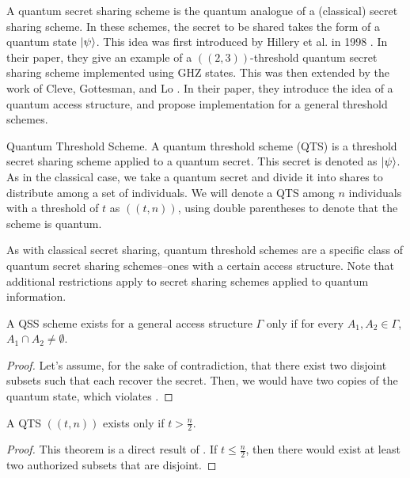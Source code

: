 A quantum secret sharing scheme is the quantum analogue of a (classical) secret sharing scheme. In these schemes, the secret to be shared takes the form of a quantum state $\ket{\psi}$. This idea was first introduced by Hillery et al. in 1998 \cite{Hillery_1999}. In their paper, they give an example of a $((2,3))$-threshold quantum secret sharing scheme implemented using GHZ states. This was then extended by the work of Cleve, Gottesman, and Lo \cite{Cleve_1999}. In their paper, they introduce the idea of a quantum access structure, and propose implementation for a general threshold schemes.

\begin{definition}{Quantum Threshold Scheme.}
    \label{defn:qts}
    A quantum threshold scheme (QTS) is a threshold secret sharing scheme applied to a quantum secret. This secret is denoted as $\ket{\psi}$. As in the classical case, we take a quantum secret and divide it into shares to distribute among a set of individuals. We will denote a QTS among $n$ individuals with a threshold of $t$ as $((t,n))$, using double parentheses to denote that the scheme is quantum.
\end{definition}

As with classical secret sharing, quantum threshold schemes are a specific class of quantum secret sharing schemes--ones with a certain access structure. Note that additional restrictions apply to secret sharing schemes applied to quantum information.

\begin{theorem}
    \label{thm:qss-disjoint}
    A QSS scheme exists for a general access structure $\Gamma$ only if for every $A_1, A_2 \in \Gamma$, $A_1 \cap A_2 \neq \emptyset$.
\end{theorem}

\begin{proof}
    Let's assume, for the sake of contradiction, that there exist two disjoint subsets such that each recover the secret. Then, we would have two copies of the quantum state, which violates . 
\end{proof}

\begin{theorem}
    \label{thm:qts}
    A QTS $((t,n))$ exists only if $t > \frac{n}{2}$.
\end{theorem}

\begin{proof}
    This theorem is a direct result of . If $t \leq \frac{n}{2}$, then there would exist at least two authorized subsets that are disjoint. 
\end{proof}


